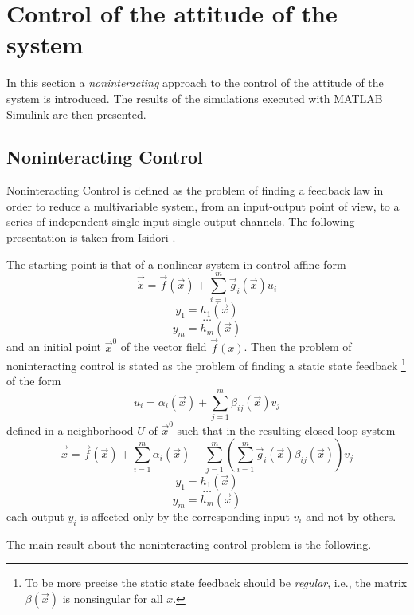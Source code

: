 \section{Control of the attitude of the system}
In this section a \emph{noninteracting} approach to the control of the
attitude of the system is introduced. The results of the simulations executed with
MATLAB Simulink are then presented.

\subsection{Noninteracting Control}
Noninteracting Control is defined as the problem of finding a feedback law in order
to reduce a multivariable system, from an input-output point of view, to a series of independent
single-input single-output channels. The following presentation is taken from Isidori \cite{Isidori1999}.
\par
The starting point is that of a nonlinear system in control affine form
\[
\vec{\dot{x}} = \vec{f}(\vec{x}) + \sum\limits_{i=1}^m \vec{g}_{i}(\vec{x}) u_{i}
\]
\[
y_{1} = h_{1}(\vec{x})
\]
\[
\hdots
\]
\[
y_{m} = h_{m}(\vec{x})
\]
and an initial point $\vec{x}^{0}$ of the vector field $\vec{f}(x)$. Then the problem of noninteracting control is stated
as the problem of finding a static state feedback
\footnote{To be more precise the static state feedback should be \emph{regular}, i.e., the
  matrix $\beta(\vec{x})$ is nonsingular for all $x$.}
of the form
\begin{equation}\label{eq:nic_input}
  u_{i} = \alpha_{i}(\vec{x}) + \sum\limits_{j=1}^m \beta_{ij}(\vec{x})v_{j}
\end{equation}
defined in a neighborhood $U$ of $\vec{x}^{0}$ such that in the resulting closed loop system
\[
\vec{\dot{x}} = \vec{f}(\vec{x}) + \sum\limits_{i=1}^m \alpha_i(\vec{x}) +
\sum\limits_{j=1}^m\left(\sum\limits_{i=1}^m \vec{g}_i(\vec{x}) \beta_{ij}(\vec{x})\right)v_{j}
\]
\[
y_{1} = h_{1}(\vec{x})
\]
\[
\hdots
\]
\[
y_{m} = h_{m}(\vec{x})
\]
each output $y_i$ is affected only by the corresponding input $v_i$ and not by others.
\par
The main result \cite{Isidori1999} about the noninteracting control problem is the following.
